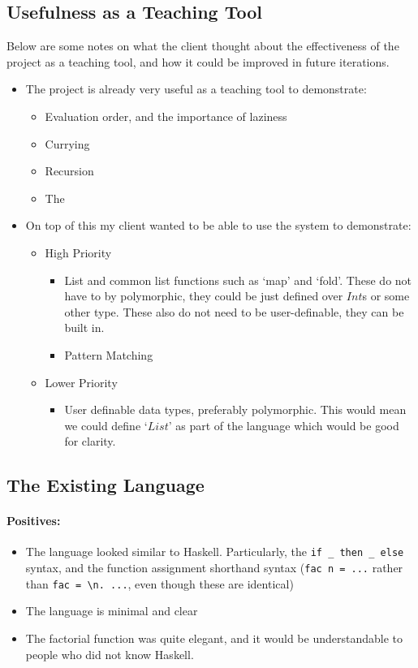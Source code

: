 \subsection{Usefulness as a Teaching Tool}
Below are some notes on what the client thought about the effectiveness of the project as a teaching tool, and how it could be improved in future iterations.
\begin{itemize}
    \item The project is already very useful as a teaching tool to demonstrate:
    \begin{itemize}
        \item Evaluation order, and the importance of laziness
        \item Currying
        \item Recursion
        \item The \lcalc
    \end{itemize}

    \item On top of this my client wanted to be able to use the system to demonstrate: 
    \begin{itemize}
        \item High Priority
        \begin{itemize}
            \item List and common list functions such as `map' and `fold'. These do not have to by polymorphic, they could be just defined over $Int$s or some other type. These also do not need to be user-definable, they can be built in. 
            \item Pattern Matching
        \end{itemize}
        \item Lower Priority 
        \begin{itemize}
            \item User definable data types, preferably polymorphic. This would mean we could define `$List$' as part of the language which would be good for clarity. 
        \end{itemize}
    \end{itemize}
\end{itemize}

\subsection{The Existing Language}
\paragraph{Positives:}
\begin{itemize}
    \item The language looked similar to Haskell. Particularly, the \verb|if _ then _ else| syntax, and the function assignment shorthand syntax (\verb|fac n = ...| rather than \verb|fac = \n. ...|, even though these are identical)
    \item The language is minimal and clear
    \item The factorial function was quite elegant, and it would be understandable to people who did not know Haskell.  
\end{itemize}


